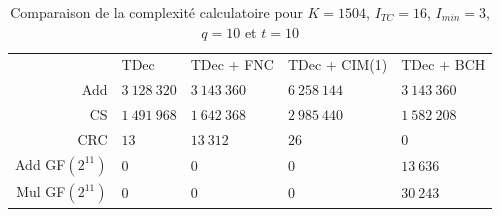 \begin{table}[!t]
    \centering
    \caption{Comparaison de la complexité calculatoire pour les différentes approches de post-traitement des turbo codes, valeurs théoriques}
    \label{tab:cplx_soa_th}
\end{table}


\begin{table}[!t]
    \centering
    \caption{Comparaison de la complexité calculatoire pour $K=1504$, $I_{TC}=16$, $I_{min}=3$, $q=10$ et $t=10$ }
    \label{tab:cplx_soa}
        \begin{tabular}{rllll}
            \toprule
            		& TDec 			& TDec + FNC 	& TDec + CIM(1) & TDec + BCH \\
            \cmidrule(l){2-2}\cmidrule(l){3-3}\cmidrule(l){4-4}\cmidrule(l){5-5}
            Add 	& $3~128~320$ 	& $3~143~360$ 	& $6~258~144$ 	& $3~143~360$ \\
            CS  	& $1~491~968$ 	& $1~642~368$ 	& $2~985~440$ 	& $1~582~208$ \\
            CRC 	& $13$      	& $13~312$   	& $26$      	& $0$       \\
            Add GF$\left(2^{11}\right)$ & $0$ & $0$ &$0$			& $13~636$ \\
            Mul GF$\left(2^{11}\right)$ & $0$ & $0$ &$0$			& $30~243$ \\
            \bottomrule
        \end{tabular}%
\end{table}

